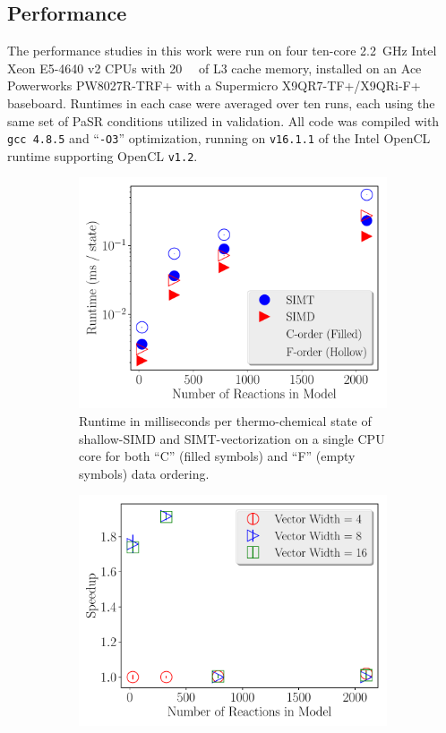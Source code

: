 \documentclass[12pt]{ussci}
\begin{document}
\subsection{Performance}
\label{S:results}
The performance studies in this work were run on four ten-core \SI{2.2}{\giga\hertz} Intel Xeon E5-4640 v2 CPUs with \SI{20}{\mega\byte} of L3 cache memory, installed on an Ace Powerworks PW8027R-TRF+ with a Supermicro X9QR7-TF+/X9QRi-F+ baseboard.
Runtimes in each case were averaged over ten runs, each using the same set of PaSR conditions utilized in validation.
All code was compiled with \texttt{gcc 4.8.5} and ``\texttt{-O3}'' optimization, running on \texttt{v16.1.1} of the Intel OpenCL runtime supporting OpenCL \texttt{v1.2}.

\begin{figure}[htb]
  \centering
  \begin{subfigure}[t]{0.48\textwidth}
    \includegraphics[width=\textwidth]{SIMD_SIMT_Order_comparison}
    \caption{Runtime in milliseconds per thermo-chemical state of shallow-SIMD and SIMT-vectorization on a single CPU core for both ``C'' (filled symbols) and ``F'' (empty symbols) data ordering.}
    \label{F:SIMDComp}
  \end{subfigure}
  \hfill
  \begin{subfigure}[t]{0.48\textwidth}
    \includegraphics[width=\textwidth]{SIMD_Vecwidth_comparison}

\end{subfigure}
\end{figure}
\end{document}
